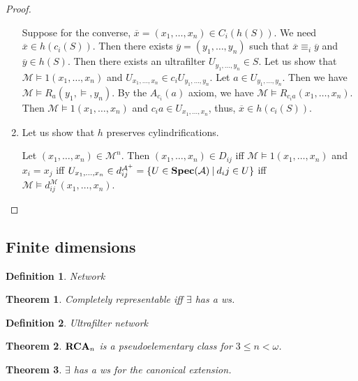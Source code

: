 \documentclass{article}
\theoremstyle{defin}
\newtheorem{definition}{Definition}
\theoremstyle{theorem}
\newtheorem{theorem}{Theorem}
\theoremstyle{claim}
\theoremstyle{prop}
\theoremstyle{lemma}
\theoremstyle{fact}
\theoremstyle{remark}
\theoremstyle{ex}
\theoremstyle{col}
\theoremstyle{question}
\begin{document}
\begin{proof}
\begin{enumerate}
Suppose for the converse, $\overline{x} = (x_1, \dots, x_n) \in C_i (h(S))$. We need $\overline{x} \in h(c_i(S))$.
Then there exists $\overline{y} = (y_1, \dots, y_n)$ such that $\overline{x} \equiv_i \overline{y}$ and $\overline{y} \in h(S)$. Then there exists an ultrafilter $U_{y_1, \dots, y_n} \in S$. Let us show that $\mathcal{M} \models 1(x_1, \dots, x_n)$ and $U_{x_1, \dots, x_n} \in c_i U_{y_1, \dots, y_n}$.
Let $a \in U_{y_1, \dots, y_n}$. Then we have $\mathcal{M} \models R_a(y_1, \models, y_n)$. By the $A_{c_i}(a)$ axiom, we have $\mathcal{M} \models R_{c_i a}(x_1, \dots, x_n)$. Then $\mathcal{M} \models 1(x_1, \dots, x_n)$ and $c_i a \in U_{x_1, \dots, x_n}$, thus, $\overline{x} \in h(c_i(S))$.
\item Let us show that $h$ preserves cylindrifications.

Let $(x_1, \dots, x_n) \in \mathcal{M}^n$. Then $(x_1, \dots, x_n) \in D_{ij}$ iff $\mathcal{M} \models 1(x_1, \dots, x_n)$ and $x_i = x_j$ iff $U_{x_1, \dots, x_n} \in d_{ij}^{\mathcal{A}^{+}} = \{ U \in {\bf Spec}(\mathcal{A}) \: | \: d_ij \in U \}$ iff $\mathcal{M} \models d_{ij}^{\mathcal{M}}(x_1, \dots, x_n)$.
\end{enumerate}
\end{proof}

\subsection{Finite dimensions}

\begin{definition}

Network
\end{definition}

\begin{theorem}

Completely representable iff $\exists$ has a ws.
\end{theorem}

\begin{definition}
Ultrafilter network
\end{definition}

\begin{theorem}
${\bf RCA}_n$ is a pseudoelementary class for $3 \leq n < \omega$.
\end{theorem}

\begin{theorem}

$\exists$ has a ws for the canonical extension.

\end{theorem}
\end{document}
